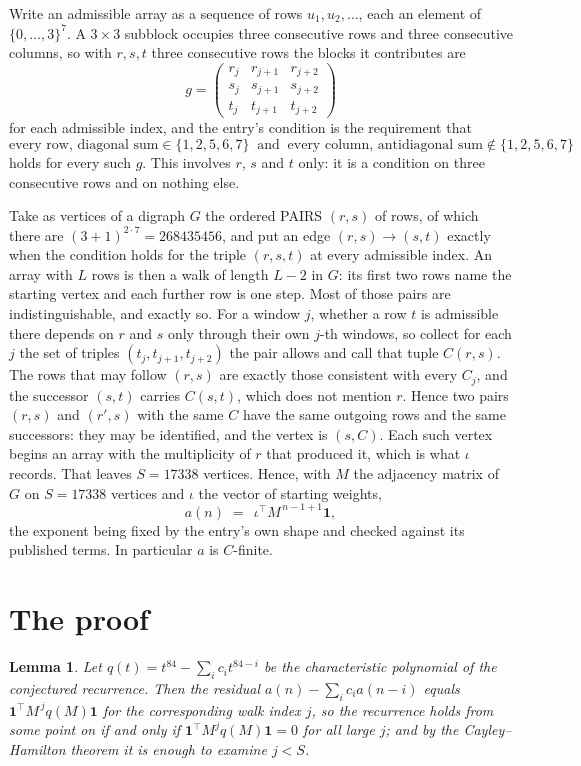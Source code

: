\documentclass[11pt,a4paper]{article}
\theoremstyle{plain}
\newtheorem{lemma}[theorem]{Lemma}
\theoremstyle{definition}
\begin{document}
Write an admissible array as a sequence of rows $u_1,u_2,\dots$, each an element of
$\{0,\dots,3\}^{7}$. A $3\times3$ subblock occupies three consecutive rows and
three consecutive columns, so with $r,s,t$ three consecutive rows the blocks it
contributes are
\[
g=\begin{pmatrix}r_j&r_{j+1}&r_{j+2}\\ s_j&s_{j+1}&s_{j+2}\\ t_j&t_{j+1}&t_{j+2}\end{pmatrix}
\]
for each admissible index, and the entry's condition is the requirement that
\[
\text{every row, diagonal sum} \in \{1,2,5,6,7\}\ \text{ and }\ \text{every column, antidiagonal sum} \notin \{1,2,5,6,7\}
\]
holds for every such $g$. This involves $r$, $s$ and $t$ only: it is a condition on
three consecutive rows and on nothing else.

Take as vertices of a digraph $G$ the ordered PAIRS $(r,s)$ of rows, of which there are
$(3+1)^{2\cdot7}=268435456$, and put an edge $(r,s)\to(s,t)$ exactly when the condition
holds for the triple $(r,s,t)$ at every admissible index. An array with $L$ rows is then a
walk of length $L-2$ in $G$: its first two rows name the starting vertex and each further
row is one step. Most of those pairs are indistinguishable, and exactly so. For a window $j$, whether a row $t$ is admissible there depends on $r$ and $s$ only through their own $j$-th windows, so collect for each $j$ the set of triples $(t_j,t_{j+1},t_{j+2})$ the pair allows and call that tuple $C(r,s)$. The rows that may follow $(r,s)$ are exactly those consistent with every $C_j$, and the successor $(s,t)$ carries $C(s,t)$, which does not mention $r$. Hence two pairs $(r,s)$ and $(r',s)$ with the same $C$ have the same outgoing rows and the same successors: they may be identified, and the vertex is $(s,C)$. Each such vertex begins an array with the multiplicity of $r$ that produced it, which is what $\iota$ records. That leaves $S=17338$ vertices. Hence, with $M$ the adjacency matrix of $G$ on $S=17338$ vertices and
$\iota$ the vector of starting weights,
\[
a(n)\;=\;\,\iota^{\!\top}M^{\,n-1+1}\mathbf{1},
\]
the exponent being fixed by the entry's own shape and checked against its published terms.
In particular $a$ is $C$-finite.

\section{The proof}

\begin{lemma}\label{lem:crit}
Let $q(t)=t^{84}-\sum_i c_it^{84-i}$ be the characteristic polynomial of the
conjectured recurrence. Then the residual $a(n)-\sum_ic_ia(n-i)$ equals
$\mathbf{1}^{\!\top}M^{\,j}q(M)\mathbf{1}$ for the corresponding walk index
$j$, so the recurrence holds from some point on if and only if
$\mathbf{1}^{\!\top}M^{j}q(M)\mathbf{1}=0$ for all large $j$; and by the
Cayley--Hamilton theorem it is enough to examine $j<S$.
\end{lemma}
\end{document}
